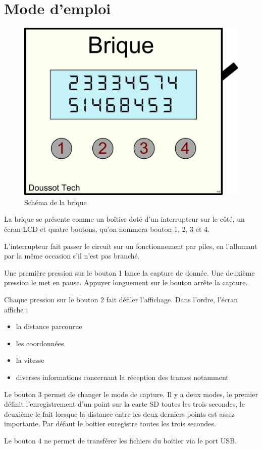 \documentclass[a4paper,12pt,titlepage]{article}
\begin{document}
\section{Mode d'emploi}

\begin{figure}[H]
    \centering
    \includegraphics[width=\textwidth]{brique_dessin.png}
    \caption{Schéma de la brique}
    \label{brique_dessin}
\end{figure}

La brique se présente comme un boîtier doté d'un interrupteur sur le côté,
un écran LCD et quatre boutons, qu'on nommera bouton 1, 2, 3 et 4.

\bigskip
L'interrupteur fait passer le circuit sur un fonctionnement par piles, en
l'allumant par la même occasion s'il n'est pas branché.

Une première pression sur le bouton 1 lance la capture de donnée. Une deuxième
pression le met en pause. Appuyer longuement sur le bouton arrête la capture.

Chaque pression sur le bouton 2 fait défiler l'affichage. Dans l'ordre,
l'écran affiche :
\begin{itemize}
    \item la distance parcourue
    \item les coordonnées
    \item la vitesse
    \item diverses informations concernant la réception des trames notamment
\end{itemize}

Le bouton 3 permet de changer le mode de capture. Il y a deux modes, le premier
définit l'enregistrement d'un point sur la carte SD toutes les trois secondes,
le deuxième le fait lorsque la distance entre les deux derniers points est
assez importante. Par défaut le boitier enregistre toutes les trois secondes.

Le bouton 4 ne permet de transférer les fichiers du boitier via le port USB.
\end{document}
